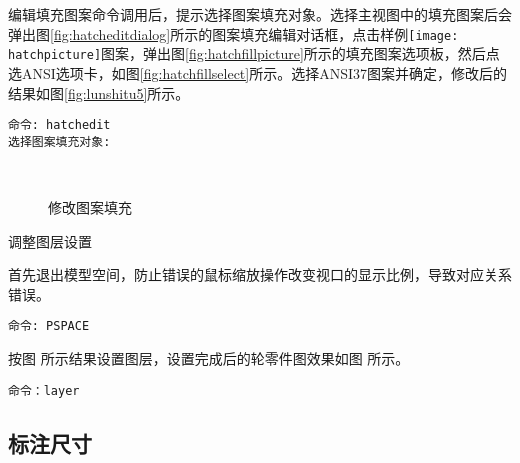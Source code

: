 \begin{procedure}
\begin{enumerate}
编辑填充图案命令调用后，提示选择图案填充对象。选择主视图中的填充图案后会弹出图\ref{fig:hatcheditdialog}所示的图案填充编辑对话框，点击样例\texttt{[image: hatchpicture]}图案，弹出图\ref{fig:hatchfillpicture}所示的填充图案选项板，然后点选ANSI选项卡，如图\ref{fig:hatchfillselect}所示。选择ANSI37图案并确定，修改后的结果如图\ref{fig:lunshitu5}所示。
\begin{lstlisting}
命令: hatchedit
选择图案填充对象:
\end{lstlisting}

\begin{figure}[htbp]
\centering
{}\hspace{20pt}
\\
\hspace{20pt}
\caption{修改图案填充}
\end{figure}

\end{enumerate}
\item 调整图层设置

首先退出模型空间，防止错误的鼠标缩放操作改变视口的显示比例，导致对应关系错误。

\begin{lstlisting}
命令: PSPACE
\end{lstlisting}

按图 所示结果设置图层，设置完成后的轮零件图效果如图 所示。
\begin{lstlisting}
命令：layer
\end{lstlisting}

\begin{figure}[htbp]
\centering
\begin{floatrow}[2]
\end{floatrow}
\end{figure}

\end{procedure}
\subsection{标注尺寸}

